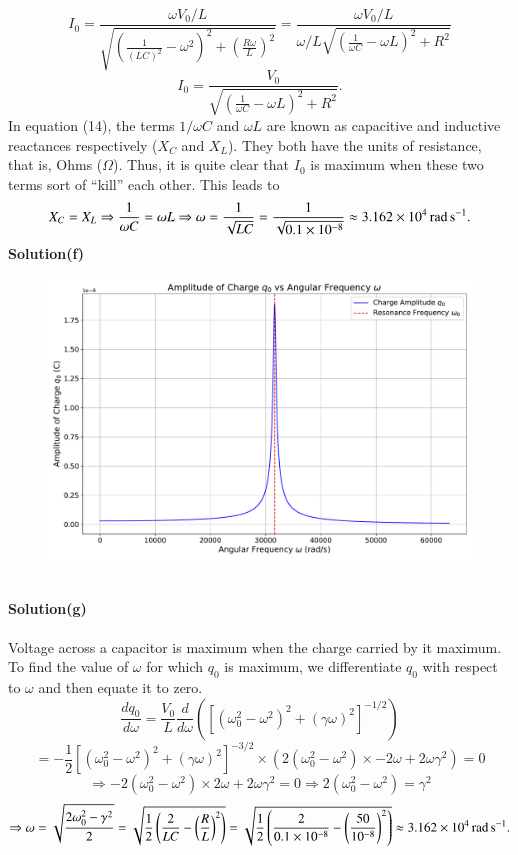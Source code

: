 \documentclass[12pt,a4paper]{article}
\begin{document}
\[I_0=\frac{\omega V_0/L}{\sqrt{\left(\frac{1}{(LC)^2}-\omega^2\right)^2+\left(\frac{R\omega}{L}\right)^2}}=\frac{\omega V_0/L}{\omega/L\sqrt{\left(\frac{1}{\omega C}-\omega L\right)^2+R^2}}\]
\begin{equation}
    I_0=\frac{V_0}{\sqrt{\left(\frac{1}{\omega C}-\omega L\right)^2+R^2}}.
\end{equation}
In equation (14), the terms $1/\omega C$ and $\omega L$ are known as capacitive and inductive reactances respectively ($X_C$ and $X_L$). They both have the units of resistance, that is, Ohms ($\Omega$). Thus, it is quite clear that $I_0$ is maximum when these two terms sort of “kill” each other. This leads to 
\[X_C=X_L\Rightarrow\frac{1}{\omega C}=\omega L\Rightarrow \omega=\frac{1}{\sqrt{LC}}=\frac{1}{\sqrt{0.1\times10^{-8}}}\approx3.162\times10^4\,\text{rad\,s}^{-1}.\]
\textbf{Solution(f)}
\begin{figure}[h]
    \centering
    \includegraphics[width=1\linewidth]{figs/fig_sol_2.5f.pdf}
\end{figure}
\\\textbf{Solution(g)}
\\
\\Voltage across a capacitor is maximum when the charge carried by it maximum. To find the value of $\omega$ for which $q_0$ is maximum, we differentiate $q_0$ with respect to $\omega$ and then equate it to zero.
\[\frac{dq_0}{d\omega}=\frac{V_0}{L}\frac{d}{d\omega}\left(\left[\left(\omega_0^2-\omega^2\right)^2+(\gamma\omega)^2\right]^{-1/2}\right)\]
\[=-\frac{1}{2}\left[\left(\omega_0^2-\omega^2\right)^2+(\gamma\omega)^2\right]^{-3/2}\times\left(2\left(\omega_0^2-\omega^2\right)\times-2\omega+2\omega\gamma^2\right)=0\]
\[\Rightarrow-2\left(\omega_0^2-\omega^2\right)\times2\omega+2\omega\gamma^2=0\Rightarrow2\left(\omega_0^2-\omega^2\right)=\gamma^2\]
\[\Rightarrow \omega=\sqrt{\frac{2\omega_0^2-\gamma^2}{2}}=\sqrt{\frac{1}{2}\left(\frac{2}{LC}-\left(\frac{R}{L}\right)^2\right)}=\sqrt{\frac{1}{2}\left(\frac{2}{0.1\times10^{-8}}-\left(\frac{50}{10^{-8}}\right)^2\right)}\approx3.162\times10^4\,\text{rad\,s}^{-1}.\]
\end{document}
